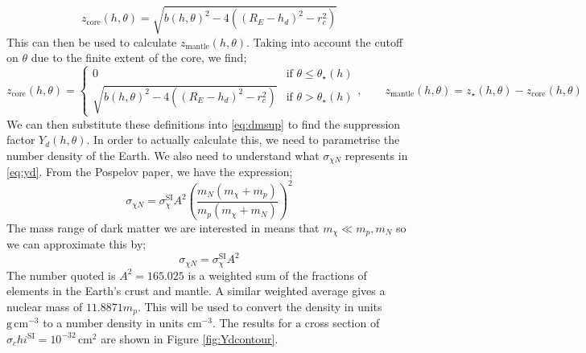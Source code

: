 \documentclass[10pt]{article}
\begin{document}
\begin{equation}
  z_{\textrm{core}}(h, \theta) = \sqrt{b(h, \theta)^2 - 4\left((R_E - h_d)^2 - r_c^2\right)}
\end{equation}
This can then be used to calculate $z_{\textrm{mantle}}(h, \theta)$. Taking into account the cutoff on $\theta$ due to the finite extent of the core, we find;
\begin{equation}
  z_{\textrm{core}}(h, \theta) = \begin{cases} 0 & \text{if } \theta \leq \theta_{\star}(h) \\ \sqrt{b(h, \theta)^2 - 4\left((R_E - h_d)^2 - r_c^2\right)} & \text{if } \theta > \theta_{\star}(h)\end{cases}, \qquad z_{\textrm{mantle}}(h, \theta) = z_{\star}(h, \theta) - z_{\textrm{core}}(h, \theta)
\end{equation}
We can then substitute these definitions into \eqref{eq:dmsup} to find the suppression factor $Y_d(h, \theta)$. In order to actually calculate this, we need to parametrise the number density of the Earth. We also need to understand what $\sigma_{\chi N}$ represents in \eqref{eq:yd}. From the Pospelov paper, we have the expression;
\begin{equation}
  \sigma_{\chi N} = \sigma_\chi^{\textrm{SI}} A^2 \left(\frac{m_N(m_\chi + m_p)}{m_p(m_\chi + m_N)}\right)^2
\end{equation}
The mass range of dark matter we are interested in means that $m_\chi \ll m_p, m_N$ so we can approximate this by;
\begin{equation}
  \sigma_{\chi N} = \sigma_{\chi}^{\textrm{SI}}A^2
\end{equation}
The number quoted is $A^2 = 165.025$ is a weighted sum of the fractions of elements in the Earth's crust and mantle. A similar weighted average gives a nuclear mass of $11.8871 m_p$. This will be used to convert the density in units $\textrm{g}\,\textrm{cm}^{-3}$ to a number density in units $\textrm{cm}^{-3}$. The results for a cross section of $\sigma_chi^{\textrm{SI}} = 10^{-32}\,\textrm{cm}^2$ are shown in Figure \ref{fig:Ydcontour}.
\end{document}
